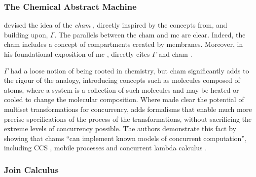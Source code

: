 
\subsubsection{The Chemical Abstract Machine}
\citeauthor{Berry1992} devised the idea of the \emph{\gls{cham}} \cite{Berry1992}, directly inspired by the concepts from, and building upon, \(\Gamma\).  The parallels between the \gls{cham} and \gls{mc} are clear.  Indeed, the \gls{cham} includes a concept of \glspl{compartment} created by membranes.  Moreover, in his foundational exposition of \gls{mc} \cite{Paun2000}, \citeauthor{Paun2000} directly cites \(\Gamma\) \cite{Banatre1988} and \gls{cham} \cite{Berry1992}.

\(\Gamma\) had a loose notion of being rooted in chemistry, but \gls{cham} significantly adds to the rigour of the analogy, introducing concepts such as molecules composed of atoms, where a system is a collection of such molecules and may be heated or cooled to change the molecular composition.  Where \cite{Banatre1993} made clear the potential of multiset transformations for concurrency, \cite{Berry1992} adds formalisms that enable much more precise specifications of the process of the transformations, without sacrificing the extreme levels of concurrency possible.  The authors demonstrate this fact by showing that \glspl{cham} \enquote{can implement known models of concurrent computation}, including CCS \cite{Milner1980}, mobile processes \cite{Milner1991} and concurrent lambda calculus \cite{Boudol1989}.%

\subsubsection{Join Calculus}

